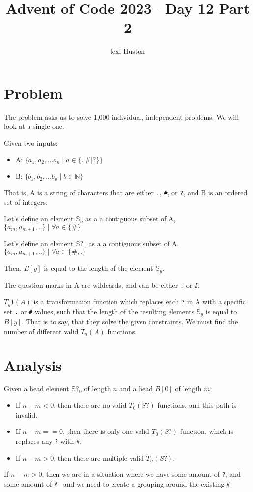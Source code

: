 \documentclass{article}
\title{Advent of Code 2023-- Day 12 Part 2}
\author{lexi Huston}
\begin{document}
 
\maketitle
 
\section{Problem}

The problem asks us to solve 1,000 individual, independent problems. We will look at a single one.

Given two inputs:

\begin{itemize}
  \item A: $ \{a_1, a_2, ... a_n \mid a \in \{.|\#|?\}\}$
  \item B: $ \{b_1, b_2, ... b_n \mid b \in \mathbb{N} \}$
\end{itemize}

That is, A is a string of characters that are either \texttt{.}, \texttt{\#}, or \texttt{?}, and B is an ordered set of integers. 


Let's define an element $\mathbb{S}_n$ as a a contiguous subset of A, $\{ a_m, a_{m+1}, ..\}\mid \forall a \in \{ \# \}$

Let's define an element $\mathbb{S?}_n$ as a a contiguous subset of A, $\{ a_m, a_{m+1}, ..\}\mid \forall a \in \{ \#, . \}$

Then, $B[y]$ is equal to the length of the element $\mathbb{S}_y$. 

The question marks in A are wildcards, and can be either \texttt{.} or \texttt{\#}. 

$ T_y1(A) $ is a transformation function which replaces each \texttt{?} in A with a specific set \texttt{.} or \texttt{\#} values, such that the length of the resulting elements $\mathbb{S}_y$ is equal to $B[y]$. That is to say, that they solve the given constraints. We must find the number of different valid $T_n(A)$ functions. 

\section{Analysis}

Given a head element $\mathbb{S?_0}$ of length $n$ and a head $B[0]$ of length $m$:

\begin{itemize}
  \item If $n - m < 0$, then there are no valid $T_0(S?)$ functions, and this path is invalid. 
  \item If $n - m == 0$, then there is only one valid $T_0(S?)$ function, which is replaces any \texttt{?} with \texttt{\#}.
  \item If $n - m > 0$, then there are multiple valid $T_n(S?)$.
\end{itemize}

If $n - m > 0$, then we are in a situation where we have some amount of \texttt{?}, and some amount of \texttt{\#}-- and we need to create a grouping around the existing \texttt{\#} 
\end{document}
